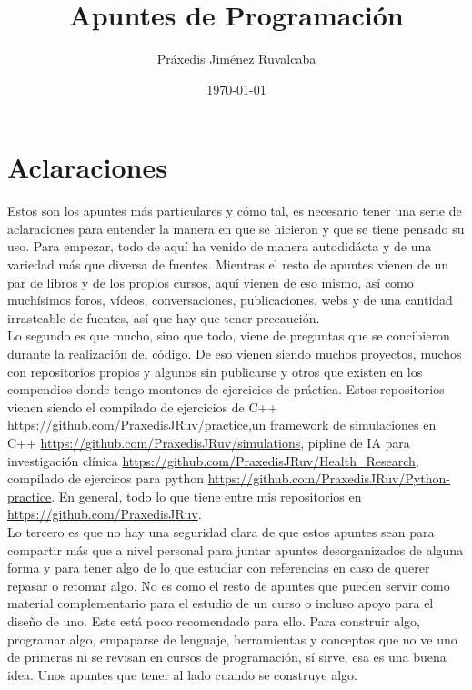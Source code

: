 \documentclass[11pt,a4paper,oneside]{report}
\title{Apuntes de Programación}
\author{Práxedis Jiménez Ruvalcaba}
\date{\today}
\theoremstyle{definition}
\theoremstyle{plain}
\theoremstyle{remark}
\begin{document}
\maketitle
\tableofcontents

\part{Aclaraciones}
Estos son los apuntes más particulares y cómo tal, es necesario tener una serie de aclaraciones para
entender la manera en que se hicieron y que se tiene pensado su uso. Para empezar, todo de aquí ha venido
de manera autodidácta y de una variedad más que diversa de fuentes. Mientras el resto de apuntes vienen
de un par de libros y de los propios cursos, aquí vienen de eso mismo, así como muchísimos foros, vídeos,
conversaciones, publicaciones, webs y de una cantidad irrasteable de fuentes, así que hay que tener precaución.\\

Lo segundo es que mucho, sino que todo, viene de preguntas que se concibieron durante la realización del código. 
De eso vienen siendo muchos proyectos, muchos con repositorios propios y algunos sin publicarse y otros que existen 
en los compendios donde tengo montones de ejercicios de práctica. Estos repositorios vienen siendo el compilado 
de ejercicios de C++ \url{https://github.com/PraxedisJRuv/practice},un framework de simulaciones en C++ 
\url{https://github.com/PraxedisJRuv/simulations}, pipline de IA para investigación clínica
\url{https://github.com/PraxedisJRuv/Health_Research}, compilado de ejercicos para python 
\url{https://github.com/PraxedisJRuv/Python-practice}. En general, todo lo que tiene entre mis repositorios en 
\url{https://github.com/PraxedisJRuv}.\\

Lo tercero es que no hay una seguridad clara de que estos apuntes sean para compartir más que a nivel 
personal para juntar apuntes desorganizados de alguna forma y para tener algo de lo que estudiar con referencias 
en caso de querer repasar o retomar algo. No es como el resto de apuntes que pueden servir como material 
complementario para el estudio de un curso o incluso apoyo para el diseño de uno. Este está poco recomendado para
ello. Para construir algo, programar algo, empaparse de lenguaje, herramientas y conceptos que no ve uno de primeras
ni se revisan en cursos de programación, sí sirve, esa es una buena idea. Unos apuntes que tener al lado cuando se 
construye algo.\\
\end{document}
